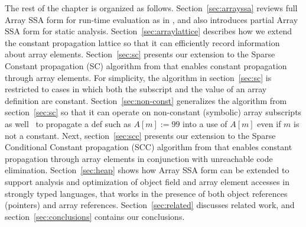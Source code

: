 The rest of the chapter is organized as follows.
Section~\ref{sec:arrayssa} reviews full Array SSA form for run-time
evaluation as in
\cite{KnSa98}, and also introduces partial Array SSA form
for static analysis.  
Section~\ref{sec:arraylattice} describes how we
extend the constant
propagation lattice so that it can efficiently
record information about array
elements.                                       
Section~\ref{sec:sc} presents our extension to the Sparse
Constant propagation (SC) algorithm from \cite{WeZa91} that enables 
constant propagation through array elements.
For simplicity, the algorithm in section~\ref{sec:sc} is restricted
to cases in which both the subscript and the value of an
array definition are constant.
Section~\ref{sec:non-const} generalizes the algorithm from section~\ref{sec:sc} so that it can operate on non-constant (symbolic) array subscripts as well
\eg\ to propagate a def such as $A[m] := 99$ into a use of $A[m]$ even
if $m$ is not a constant.
Next,
section~\ref{sec:scc} presents our extension to the Sparse Conditional
Constant propagation (SCC) algorithm from \cite{WeZa91} that enables
constant propagation through array elements in conjunction with 
unreachable code elimination.
Section~\ref{sec:heap} shows how Array SSA form can be extended to support
analysis and
optimization of 
object field and array element accesses in strongly typed languages, 
that works in the presence of both object references (pointers) and array references.
Section~\ref{sec:related} discusses related work, and section~\ref{sec:conclusions} contains our conclusions.


